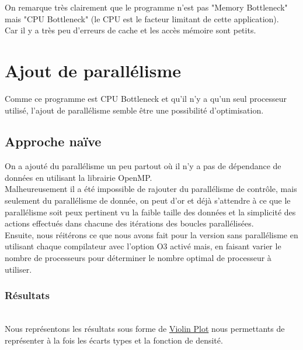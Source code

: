 \documentclass[
 aip,
 jmp,
 amsmath,amssymb,
 reprint
]{revtex4-1}
\begin{document}
On remarque très clairement que le programme n'est pas "Memory Bottleneck" mais "CPU Bottleneck" (le CPU est le facteur limitant de cette application).\\
Car il y a très peu d'erreurs de cache et les accès mémoire sont petits.

\section{Ajout de parallélisme}

Comme ce programme est CPU Bottleneck et qu'il n'y a qu'un seul processeur utilisé, l'ajout de parallélisme semble être une possibilité d'optimisation.

\subsection{Approche naïve}
On a ajouté du parallélisme un peu partout où il n'y a pas de dépendance de données en utilisant la librairie OpenMP.\\
Malheureusement il a été impossible de rajouter du parallélisme de contrôle, mais seulement du parallélisme de donnée, on peut d'or et déjà s'attendre à ce que le parallélisme soit peux pertinent vu la faible taille des données et la simplicité des actions effectués dans chacune des itérations des boucles parallélisées.\\
Ensuite, nous réitérons ce que nous avons fait pour la version sans parallélisme en utilisant chaque compilateur avec l'option O3 activé mais, en faisant varier le nombre de processeurs pour déterminer le nombre optimal de processeur à utiliser.\\

\subsubsection{Résultats}\mbox{}\\

Nous représentons les résultats sous forme de \href{https://en.wikipedia.org/wiki/Violin_plot}{Violin Plot} nous permettants de représenter à la fois les écarts types et la fonction de densité.
\end{document}
